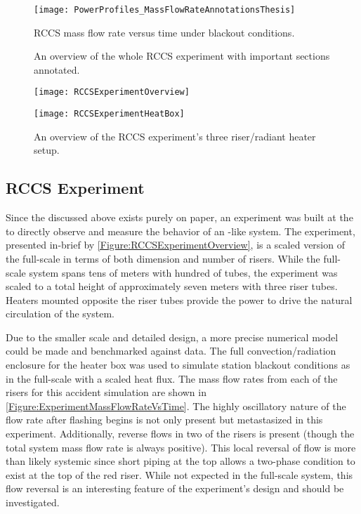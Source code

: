 \begin{figure}%
    \centering
    \caption[RCCS mass flow rate under blackout conditions]{RCCS mass flow rate versus time under blackout conditions.}%
    \label{Figure:RCCSFullScaleMassFlowRate}%
    \texttt{[image: PowerProfiles\_MassFlowRateAnnotationsThesis]}%
\end{figure}


\begin{figure}%
    \centering
    \caption[RCCS Experiment Full System diagram]{An overview of the whole RCCS experiment with important sections annotated.}%
    \label{Figure:RCCSExperimentOverview}%
    \texttt{[image: RCCSExperimentOverview]}
    \vspace*{4em}
    \centering
    \caption[RCCS Experiment Three Riser diagram]{An overview of the RCCS experiment's three riser/radiant heater setup.}%
    \label{Figure:RCCSExperimentHeatBox}%
    \texttt{[image: RCCSExperimentHeatBox]}%
\end{figure}

\subsection{\TheUniversity RCCS Experiment}
Since the  discussed above exists purely on paper, an experiment was built at the \TheUniversity to directly observe and measure the behavior of an -like system.
The experiment, presented in-brief by \cref{Figure:RCCSExperimentOverview}, is a scaled version of the full-scale  in terms of both dimension and number of risers.
While the full-scale system spans tens of meters with hundred of tubes, the experiment was scaled to a total height of approximately seven meters with three riser tubes.
Heaters mounted opposite the riser tubes provide the power to drive the natural circulation of the system.

Due to the smaller scale and detailed design, a more precise numerical model could be made and benchmarked against data.
The full convection/radiation enclosure for the heater box was used to simulate station blackout conditions as in the full-scale with a scaled heat flux.
The mass flow rates from each of the risers for this accident simulation are shown in \cref{Figure:ExperimentMassFlowRateVsTime}.
The highly oscillatory nature of the flow rate after flashing begins is not only present but metastasized in this experiment.
Additionally, reverse flows in two of the risers is present (though the total system mass flow rate is always positive).
This local reversal of flow is more than likely systemic since short piping at the top allows a two-phase condition to exist at the top of the red riser.
While not expected in the full-scale system, this flow reversal is an interesting feature of the experiment's design and should be investigated.


